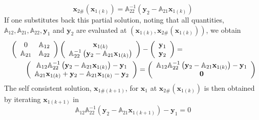 \documentclass[aps,preprint]{revtex4}%
\begin{document}
\begin{equation}
\mathbf{x}_{2\#}\left(  \mathbf{x}_{1\left(  k\right)  }\right)
=\mathbb{A}_{22}^{-1}\left(  \mathbf{y}_{2}-\mathbb{A}_{21}\mathbf{x}%
_{1\left(  k\right)  }\right)  \label{x2}%
\end{equation}
If one substitutes back this partial solution, noting that all quantities,
$\mathbb{A}_{12},\mathbb{A}_{21},\mathbb{A}_{22},\mathbf{y}_{1}$ and
$\mathbf{y}_{2}$ are evaluated at $\left(  \mathbf{x}_{1\left(  k\right)
},\mathbf{x}_{2\#}\left(  \mathbf{x}_{1\left(  k\right)  }\right)  \right)  $,
we obtain
\begin{align}
&  \left(
\begin{array}
[c]{cc}%
0 & \mathbb{A}_{12}\\
\mathbb{A}_{21} & \mathbb{A}_{22}%
\end{array}
\right)  \left(
\begin{array}
[c]{c}%
\mathbf{x}_{1\left(  k\right)  }\\
\mathbb{A}_{22}^{-1}\left(  \mathbf{y}_{2}-\mathbb{A}_{21}\mathbf{x}_{1\left(
k\right)  }\right)
\end{array}
\right)  -\left(
\begin{array}
[c]{c}%
\mathbf{y}_{1}\\
\mathbf{y}_{2}%
\end{array}
\right)  =\nonumber\\
&  \qquad\left(
\begin{array}
[c]{c}%
\mathbb{A}_{12}\mathbb{A}_{22}^{-1}\left(  \mathbf{y}_{2}-\mathbb{A}%
_{21}\mathbf{x}_{1\left(  k\right)  }\right)  -\mathbf{y}_{1}\\
\mathbb{A}_{21}\mathbf{x}_{1\left(  k\right)  }+\mathbf{y}_{2}-\mathbb{A}%
_{21}\mathbf{x}_{1\left(  k\right)  }-\mathbf{y}_{2}%
\end{array}
\right)  =\left(
\begin{array}
[c]{c}%
\mathbb{A}_{12}\mathbb{A}_{22}^{-1}\left(  \mathbf{y}_{2}-\mathbb{A}%
_{21}\mathbf{x}_{1\left(  k\right)  }\right)  -\mathbf{y}_{1}\\
\mathbf{0}%
\end{array}
\right)  \label{baksub}%
\end{align}
The self consistent solution, $\mathbf{x}_{1\#\left(  k+1\right)  }$, for
$\mathbf{x}_{1}$ at $\mathbf{x}_{2\#}\left(  \mathbf{x}_{1\left(  k\right)
}\right)  $ is then obtained by iterating $\mathbf{x}_{1\left(  k+1\right)  }$
in%
\begin{equation}
\mathbb{A}_{12}\mathbb{A}_{22}^{-1}\left(  \mathbf{y}_{2}-\mathbb{A}%
_{21}\mathbf{x}_{1\left(  k+1\right)  }\right)  -\mathbf{y}_{1}=0
\end{equation}
\end{document}
